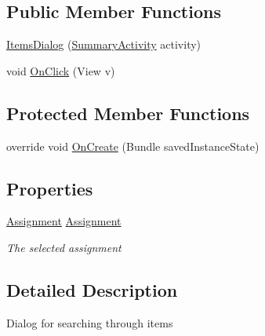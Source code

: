 \subsection*{Public Member Functions}
\begin{DoxyCompactItemize}
\item 
\hyperlink{class_field_service_1_1_android_1_1_dialogs_1_1_items_dialog_aa3278161400147e289507b5561a8de3e}{Items\+Dialog} (\hyperlink{class_field_service_1_1_android_1_1_summary_activity}{Summary\+Activity} activity)
\item 
void \hyperlink{class_field_service_1_1_android_1_1_dialogs_1_1_items_dialog_ac7ebb161b6bcced723d187e9a824ad89}{On\+Click} (View v)
\end{DoxyCompactItemize}
\subsection*{Protected Member Functions}
\begin{DoxyCompactItemize}
\item 
override void \hyperlink{class_field_service_1_1_android_1_1_dialogs_1_1_items_dialog_a1079fd015a477608c7a923ff7b2b71fa}{On\+Create} (Bundle saved\+Instance\+State)
\end{DoxyCompactItemize}
\subsection*{Properties}
\begin{DoxyCompactItemize}
\item 
\hyperlink{class_field_service_1_1_data_1_1_assignment}{Assignment} \hyperlink{class_field_service_1_1_android_1_1_dialogs_1_1_items_dialog_acf190fcd4177dc635e304b39bc896e7d}{Assignment}
\begin{DoxyCompactList}\small\item\em The selected assignment \end{DoxyCompactList}\end{DoxyCompactItemize}


\subsection{Detailed Description}
Dialog for searching through items 



